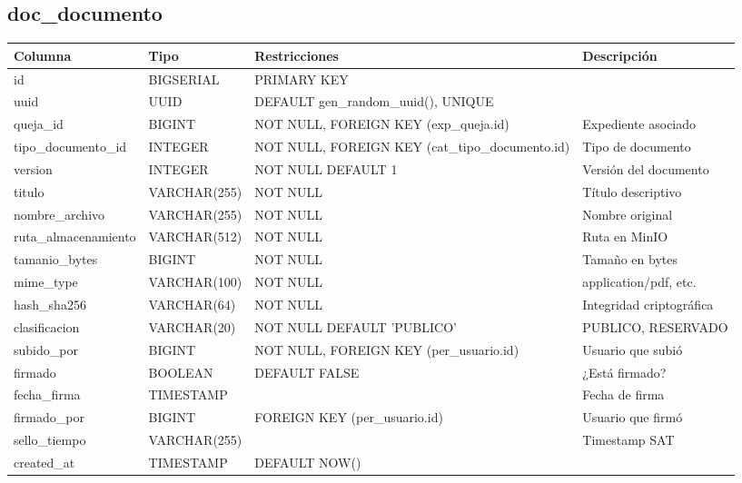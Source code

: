 \documentclass[12pt, a4paper]{article}
\begin{document}
\subsection{doc\_documento}
\begin{longtable}{|p{3.5cm}|p{2.5cm}|p{3cm}|p{5cm}|}
    \hline
    \rowcolor[gray]{0.9}
    \textbf{Columna} & \textbf{Tipo} & \textbf{Restricciones} & \textbf{Descripción} \\
    \hline
    id & BIGSERIAL & PRIMARY KEY & \\
    \hline
    uuid & UUID & DEFAULT gen\_random\_uuid(), UNIQUE & \\
    \hline
    queja\_id & BIGINT & NOT NULL, FOREIGN KEY (exp\_queja.id) & Expediente asociado \\
    \hline
    tipo\_documento\_id & INTEGER & NOT NULL, FOREIGN KEY (cat\_tipo\_documento.id) & Tipo de documento \\
    \hline
    version & INTEGER & NOT NULL DEFAULT 1 & Versión del documento \\
    \hline
    titulo & VARCHAR(255) & NOT NULL & Título descriptivo \\
    \hline
    nombre\_archivo & VARCHAR(255) & NOT NULL & Nombre original \\
    \hline
    ruta\_almacenamiento & VARCHAR(512) & NOT NULL & Ruta en MinIO \\
    \hline
    tamanio\_bytes & BIGINT & NOT NULL & Tamaño en bytes \\
    \hline
    mime\_type & VARCHAR(100) & NOT NULL & application/pdf, etc. \\
    \hline
    hash\_sha256 & VARCHAR(64) & NOT NULL & Integridad criptográfica \\
    \hline
    clasificacion & VARCHAR(20) & NOT NULL DEFAULT 'PUBLICO' & PUBLICO, RESERVADO \\
    \hline
    subido\_por & BIGINT & NOT NULL, FOREIGN KEY (per\_usuario.id) & Usuario que subió \\
    \hline
    firmado & BOOLEAN & DEFAULT FALSE & ¿Está firmado? \\
    \hline
    fecha\_firma & TIMESTAMP & & Fecha de firma \\
    \hline
    firmado\_por & BIGINT & FOREIGN KEY (per\_usuario.id) & Usuario que firmó \\
    \hline
    sello\_tiempo & VARCHAR(255) & & Timestamp SAT \\
    \hline
    created\_at & TIMESTAMP & DEFAULT NOW() & \\
    \hline
\end{longtable}
\end{document}

